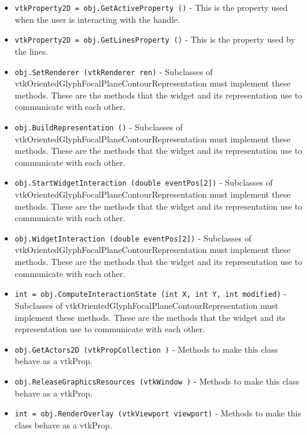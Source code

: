 \begin{itemize}
\item  \verb|vtkProperty2D = obj.GetActiveProperty ()| -  This is the property used when the user is interacting
 with the handle.

\item  \verb|vtkProperty2D = obj.GetLinesProperty ()| -  This is the property used by the lines.

\item  \verb|obj.SetRenderer (vtkRenderer ren)| -  Subclasses of vtkOrientedGlyphFocalPlaneContourRepresentation must implement these methods. These
 are the methods that the widget and its representation use to
 communicate with each other.

\item  \verb|obj.BuildRepresentation ()| -  Subclasses of vtkOrientedGlyphFocalPlaneContourRepresentation must implement these methods. These
 are the methods that the widget and its representation use to
 communicate with each other.

\item  \verb|obj.StartWidgetInteraction (double eventPos[2])| -  Subclasses of vtkOrientedGlyphFocalPlaneContourRepresentation must implement these methods. These
 are the methods that the widget and its representation use to
 communicate with each other.

\item  \verb|obj.WidgetInteraction (double eventPos[2])| -  Subclasses of vtkOrientedGlyphFocalPlaneContourRepresentation must implement these methods. These
 are the methods that the widget and its representation use to
 communicate with each other.

\item  \verb|int = obj.ComputeInteractionState (int X, int Y, int modified)| -  Subclasses of vtkOrientedGlyphFocalPlaneContourRepresentation must implement these methods. These
 are the methods that the widget and its representation use to
 communicate with each other.

\item  \verb|obj.GetActors2D (vtkPropCollection )| -  Methods to make this class behave as a vtkProp.

\item  \verb|obj.ReleaseGraphicsResources (vtkWindow )| -  Methods to make this class behave as a vtkProp.

\item  \verb|int = obj.RenderOverlay (vtkViewport viewport)| -  Methods to make this class behave as a vtkProp.


\end{itemize}
